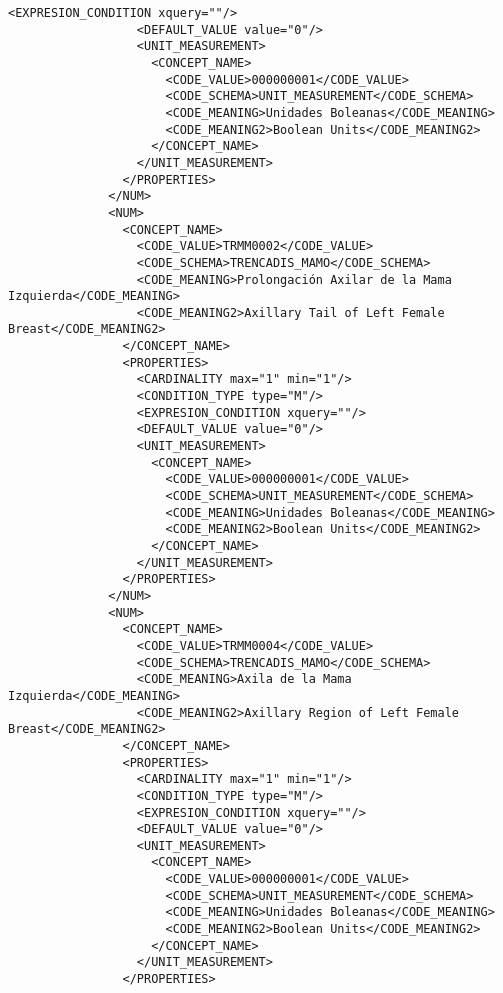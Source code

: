 \begin{lstlisting}[label=some-code,caption=Some Code]
                  <EXPRESION_CONDITION xquery=""/>
                  <DEFAULT_VALUE value="0"/>
                  <UNIT_MEASUREMENT>
                    <CONCEPT_NAME>
                      <CODE_VALUE>000000001</CODE_VALUE>
                      <CODE_SCHEMA>UNIT_MEASUREMENT</CODE_SCHEMA>
                      <CODE_MEANING>Unidades Boleanas</CODE_MEANING>
                      <CODE_MEANING2>Boolean Units</CODE_MEANING2>
                    </CONCEPT_NAME>
                  </UNIT_MEASUREMENT>
                </PROPERTIES>
              </NUM>
              <NUM>
                <CONCEPT_NAME>
                  <CODE_VALUE>TRMM0002</CODE_VALUE>
                  <CODE_SCHEMA>TRENCADIS_MAMO</CODE_SCHEMA>
                  <CODE_MEANING>Prolongación Axilar de la Mama Izquierda</CODE_MEANING>
                  <CODE_MEANING2>Axillary Tail of Left Female Breast</CODE_MEANING2>
                </CONCEPT_NAME>
                <PROPERTIES>
                  <CARDINALITY max="1" min="1"/>
                  <CONDITION_TYPE type="M"/>
                  <EXPRESION_CONDITION xquery=""/>
                  <DEFAULT_VALUE value="0"/>
                  <UNIT_MEASUREMENT>
                    <CONCEPT_NAME>
                      <CODE_VALUE>000000001</CODE_VALUE>
                      <CODE_SCHEMA>UNIT_MEASUREMENT</CODE_SCHEMA>
                      <CODE_MEANING>Unidades Boleanas</CODE_MEANING>
                      <CODE_MEANING2>Boolean Units</CODE_MEANING2>
                    </CONCEPT_NAME>
                  </UNIT_MEASUREMENT>
                </PROPERTIES>
              </NUM>
              <NUM>
                <CONCEPT_NAME>
                  <CODE_VALUE>TRMM0004</CODE_VALUE>
                  <CODE_SCHEMA>TRENCADIS_MAMO</CODE_SCHEMA>
                  <CODE_MEANING>Axila de la Mama Izquierda</CODE_MEANING>
                  <CODE_MEANING2>Axillary Region of Left Female Breast</CODE_MEANING2>
                </CONCEPT_NAME>
                <PROPERTIES>
                  <CARDINALITY max="1" min="1"/>
                  <CONDITION_TYPE type="M"/>
                  <EXPRESION_CONDITION xquery=""/>
                  <DEFAULT_VALUE value="0"/>
                  <UNIT_MEASUREMENT>
                    <CONCEPT_NAME>
                      <CODE_VALUE>000000001</CODE_VALUE>
                      <CODE_SCHEMA>UNIT_MEASUREMENT</CODE_SCHEMA>
                      <CODE_MEANING>Unidades Boleanas</CODE_MEANING>
                      <CODE_MEANING2>Boolean Units</CODE_MEANING2>
                    </CONCEPT_NAME>
                  </UNIT_MEASUREMENT>
                </PROPERTIES>

\end{lstlisting}
